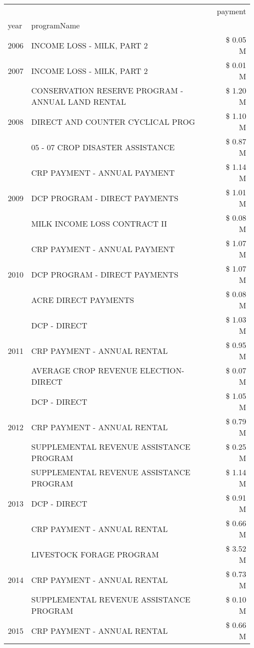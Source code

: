 \begin{tabular}{llr}
\toprule
 &  & payment \\
year & programName &  \\
\midrule
2006 & INCOME LOSS - MILK, PART 2 & \$ 0.05 M \\
\cline{1-3}
2007 & INCOME LOSS - MILK, PART 2 & \$ 0.01 M \\
\cline{1-3}
\multirow[t]{3}{*}{2008} & CONSERVATION RESERVE PROGRAM - ANNUAL LAND RENTAL & \$ 1.20 M \\
 & DIRECT AND COUNTER CYCLICAL PROG & \$ 1.10 M \\
 & 05 - 07 CROP DISASTER ASSISTANCE & \$ 0.87 M \\
\cline{1-3}
\multirow[t]{3}{*}{2009} & CRP PAYMENT - ANNUAL PAYMENT & \$ 1.14 M \\
 & DCP PROGRAM - DIRECT PAYMENTS & \$ 1.01 M \\
 & MILK INCOME LOSS CONTRACT II & \$ 0.08 M \\
\cline{1-3}
\multirow[t]{3}{*}{2010} & CRP PAYMENT - ANNUAL PAYMENT & \$ 1.07 M \\
 & DCP PROGRAM - DIRECT PAYMENTS & \$ 1.07 M \\
 & ACRE DIRECT PAYMENTS & \$ 0.08 M \\
\cline{1-3}
\multirow[t]{3}{*}{2011} & DCP - DIRECT & \$ 1.03 M \\
 & CRP PAYMENT - ANNUAL RENTAL & \$ 0.95 M \\
 & AVERAGE CROP REVENUE ELECTION-DIRECT & \$ 0.07 M \\
\cline{1-3}
\multirow[t]{3}{*}{2012} & DCP - DIRECT & \$ 1.05 M \\
 & CRP PAYMENT - ANNUAL RENTAL & \$ 0.79 M \\
 & SUPPLEMENTAL REVENUE ASSISTANCE PROGRAM & \$ 0.25 M \\
\cline{1-3}
\multirow[t]{3}{*}{2013} & SUPPLEMENTAL REVENUE ASSISTANCE PROGRAM & \$ 1.14 M \\
 & DCP - DIRECT & \$ 0.91 M \\
 & CRP PAYMENT - ANNUAL RENTAL & \$ 0.66 M \\
\cline{1-3}
\multirow[t]{3}{*}{2014} & LIVESTOCK FORAGE PROGRAM & \$ 3.52 M \\
 & CRP PAYMENT - ANNUAL RENTAL & \$ 0.73 M \\
 & SUPPLEMENTAL REVENUE ASSISTANCE PROGRAM & \$ 0.10 M \\
\cline{1-3}
\multirow[t]{3}{*}{2015} & CRP PAYMENT - ANNUAL RENTAL & \$ 0.66 M \\

\end{tabular}
